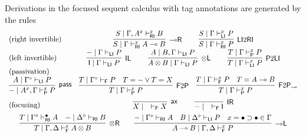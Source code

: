 \documentclass[copyright,creativecommons]{eptcs}
\theoremstyle{definition}
\newtheorem{defn}{Definition}[section]
\newcommand{\tl}{\otimes \mathsf{L}}
\newcommand{\tr}{\otimes \mathsf{R}}
\newcommand{\lright}{{\multimap}\mathsf{R}}
\newcommand{\lleft}{{\multimap}\mathsf{L}}
\newcommand{\pass}{\mathsf{pass}}
\newcommand{\unitl}{\mathsf{IL}}
\newcommand{\unitr}{\mathsf{IR}}
\newcommand{\ax}{\mathsf{ax}}
\newcommand{\ot}{\otimes}
\newcommand{\lolli}{\multimap}
\newcommand{\I}{\mathsf{I}}
\newcommand{\RI}{\mathsf{RI}}
\newcommand{\LI}{\mathsf{LI}}
\newcommand{\Pass}{\mathsf{P}}
\newcommand{\F}{\mathsf{F}}
\newcommand{\xvdash}{\vdash^{x}}
\newcommand{\proofbox}[1]{\begin{tabular}{l} #1 \end{tabular}}
\newcommand{\NMILL}{\texttt{NMILL}}
\newcommand{\SkNMILL}{\NMILL\textsuperscript{\textit{s}}}
\newcommand{\FSkMCC}{\mathsf{Free}}
\begin{document}
Derivations in the focused sequent calculus with tag annotations are generated by the rules
\begin{equation}\label{eq:focus}
  \begin{array}{lc}
    \text{(right invertible)} & %
    \proofbox{
      \infer[\lright]{S \mid \Gamma \vdash^{x}_{\RI} A \lolli B}{S \mid \Gamma , A^{x} \vdash^{x}_{\RI} B}
    \qquad
    \infer[\LI 2 \RI]{S \mid \Gamma \vdash^{x}_{\RI} P}{S \mid \Gamma \vdash^{x}_{\LI} P}
    }
    \\[6pt]
    \text{(left invertible)} & %
    \proofbox{
      \infer[\unitl]{\I \mid \Gamma \vdash_{\LI} P}{{-} \mid \Gamma \vdash_{\LI} P}
    \qquad
    \infer[\tl]{A \ot B \mid \Gamma \vdash_{\LI} P}{A \mid B , \Gamma \vdash_{\LI} P}
    \qquad
    \infer[\Pass 2 \LI]{T \mid \Gamma \xvdash_{\LI} P}{T \mid \Gamma \xvdash_{\Pass} P}
    }
    \\
    \text{(passivation)} & \\ %
   \multicolumn{2}{c}{
    \infer[\pass]{{-} \mid A^{x} , \Gamma \xvdash_{\Pass} P }{
      A\mid \Gamma^{\circ} \vdash_{\LI} P
    }
    \quad
%    
    \infer[\F 2 \Pass]{T \mid \Gamma \xvdash_{\Pass} P}{
      T \mid \Gamma^\circ \vdash_{\F} P &
      T = {-} \vee T = X
    }
    \quad
    \infer[\F 2 \Pass_{{\lolli}}]{T \mid \Gamma \xvdash_{\Pass} P}{
      T \mid \Gamma \xvdash_{\F} P &
      T = A \lolli B
    }
    }
    \\[6pt]
    \text{(focusing)} &    %
    \proofbox{\infer[\ax]{X \mid \quad \vdash_{\F} X}{}
    \qquad
    \infer[\unitr]{{-} \mid \quad \vdash_{\F} \I}{}
    }
    \\[6pt]
    \multicolumn{2}{c}{
    \infer[\tr]{T \mid \Gamma , \Delta \xvdash_{\F} A \ot B}{
      T \mid \Gamma^{\circ} \vdash^{\bullet}_{\RI} A
      &
      {-} \mid \Delta^{\circ} \vdash_{\RI} B
    }
    \qquad
    \infer[\lleft]{A \lolli B \mid \Gamma , \Delta \xvdash_{\F} P}{
      {-} \mid \Gamma^{\circ} \vdash_{\RI} A
      &
      B \mid \Delta^{\circ} \vdash_{\LI} P
      &
      x = \bullet \supset \bullet \in \Gamma
    }
    }
  \end{array}
\end{equation}
\end{document}
